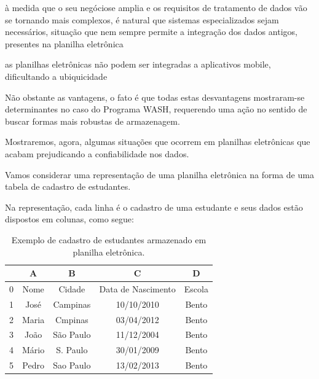 \documentclass[
12pt,		%
openright,	%
twoside,  %
a4paper,			%
chapter=TITLE,		%
english,			%
french,				%
spanish,			%
brazil				%
]{USPSC-classe/USPSC}
\begin{document}
\begin{alineas}
\item \`a medida que o seu \textquotedbl neg\'ocio\textquotedbl  se amplia e os requisitos de tratamento de dados v\~ao se tornando mais complexos, \'e natural que sistemas especializados sejam necess\'arios, situa\c{c}\~ao que nem sempre permite a integra\c{c}\~ao dos dados antigos, presentes na planilha eletr\^onica
\item as planilhas eletr\^onicas n\~ao podem ser integradas a aplicativos mobile, dificultando a ubiquicidade
\end{alineas}

N\~ao obstante as vantagens, o fato \'e que todas estas desvantagens mostraram-se determinantes no caso do Programa WASH, requerendo uma a\c{c}\~ao no sentido de buscar formas mais robustas de armazenagem.









Mostraremos, agora, algumas situa\c{c}\~oes que ocorrem em planilhas eletr\^onicas que acabam prejudicando a confiabilidade nos dados.









Vamos considerar uma representa\c{c}\~ao de uma planilha eletr\^onica na forma de uma tabela de cadastro de estudantes.









Na representa\c{c}\~ao, cada linha \'e o cadastro de uma estudante e seus dados est\~ao dispostos em colunas, como segue:













\begin{table}[htb]
\tiny
\caption{\label{ddd7a335bbc10f88eaaf4abda266d151f0ba0e6f}Exemplo de cadastro de estudantes armazenado em planilha eletr\^onica.}

\centering
\begin{tabular}{|c|c|c|c|c|}
\hline
  &  A  &  B  &  C  &  D  \\
\hline
0 & Nome  &  Cidade  &  Data de Nascimento  &  Escola \\
1 & Jos\'e  &  Campinas  &  10/10/2010  &  Bento \\
2 & Maria  &  Cmpinas  &  03/04/2012  &  Bento \\
3 & Jo\~ao  &  S\~ao Paulo  &  11/12/2004  &  Bento \\
4 & M\'ario  &  S. Paulo  &  30/01/2009  &  Bento \\
5 & Pedro  &  Sao Paulo  &  13/02/2013  &  Bento \\
\hline
\end{tabular}
\end{table}
\end{document}
